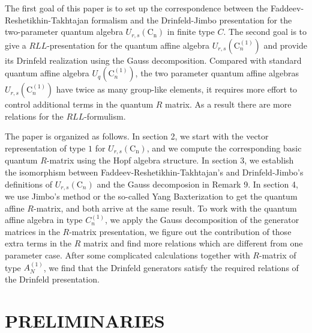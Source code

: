\documentclass[10pt,a4paper]{amsart}
\numberwithin{equation}{section}
\begin{document}
The first goal of this paper is to set up the correspondence between the Faddeev-Reshetikhin-Takhtajan formalism and the Drinfeld-Jimbo presentation for the two-parameter quantum algebra $U_{r, s}(\mathrm{C}_{\mathrm{n}})$ in finite type $C$. The second goal is to give a $RLL$-presentation for the quantum affine algebra $U_{r, s}(\mathrm{C}_n^{(1)})$ and provide its Drinfeld realization
using the Gauss decomposition. Compared with standard quantum affine algebra $U_{q}(\mathrm{C}_n^{(1)})$, the two parameter quantum affine algebras $U_{r, s}(\mathrm{C}_n^{(1)})$ have twice as many group-like elements, it requires more effort to
control additional terms in the quantum $R$ matrix. As a result there are more relations for the $RLL$-formulism.

The paper is organized as follows. In section 2, we start with the vector representation of type $1$ for $U_{r, s}\left(\mathrm{C}_{\mathrm{n}}\right)$, and we compute the corresponding basic quantum $R$-matrix using the Hopf algebra structure. In section 3, we establish the isomorphism between Faddeev-Reshetikhin-Takhtajan's and Drinfeld-Jimbo's definitions of $U_{r,s}\left(\mathrm{C}_n\right)$ and the Gauss decomposion in Remark 9. In section 4, we use Jimbo's method or the so-called Yang Baxterization \cite{GWX} to get the quantum affine $R$-matrix, and both arrive at the same result. To work with the quantum affine algebra in type $C^{(1)}_n$, we apply the Gauss decomposition of the generator matrices in the $R$-matrix presentation, we figure out the contribution of those extra terms in the $R$ matrix and find more relations which are different from one parameter case. After some complicated calculations together with $R$-matrix of type $A_N^{(1)}$, we find that the Drinfeld generators satisfy the required relations of the Drinfeld presentation.

	\section{PRELIMINARIES}
\end{document}
